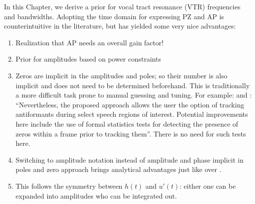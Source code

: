 \begin{chaptersections}{%
In this Chapter, we derive a prior for vocal tract resonance (VTR) frequencies and bandwidths.
}
Adopting the time domain for expressing PZ and AP is counterintuitive in the literature, but has yielded some very nice advantages:
\begin{enumerate}
	\item Realization that AP needs an overall gain factor!
	\item Prior for amplitudes based on power constraints
	\item Zeros are implicit in the amplitudes and poles; so their number is also implicit and does not need to be determined beforehand. This is traditionally a more difficult task prone to manual guessing and tuning. For example: \citep[][pp.~194-197]{Fulop2011} and \citep[][p.~11]{Mehta2012}: ``Nevertheless, the proposed approach allows
	the user the option of tracking antiformants during select
	speech regions of interest. Potential improvements here
	include the use of formal statistics tests for detecting the
	presence of zeros within a frame prior to tracking them''. There is no need for such tests here.
	\item Switching to amplitude notation instead of amplitude and phase implicit in poles and zero approach brings analytical advantages just like \citep{Bretthorst1988} over \citep{Jaynes1987}.
	\item This follows the symmetry between $h(t)$ and $u'(t)$: either one can be expanded into amplitudes who can be integrated out.
\end{enumerate}

\end{chaptersections}

